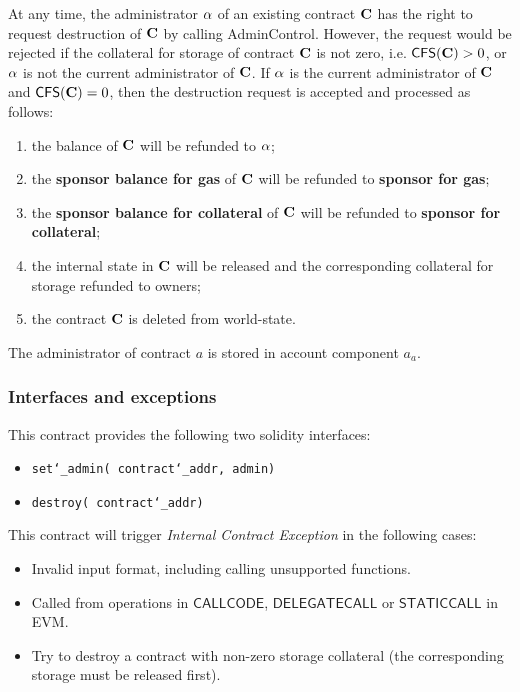 At any time, the administrator $\mathbf{\alpha}$ of an existing contract $\mathbf{C}$ has the right to request destruction of $\mathbf{C}$ by calling AdminControl.
However, the request would be rejected if the collateral for storage of contract $\mathbf{C}$ is not zero, i.e. $\mathsf{CFS}(\mathbf{C})>0$, or $\mathbf{\alpha}$ is not the current administrator of $\mathbf{C}$.
If $\mathbf{\alpha}$ is the current administrator of $\mathbf{C}$ and $\mathsf{CFS}(\mathbf{C})=0$, then the destruction request is accepted and processed as follows:
\begin{enumerate}[nosep]
 	\item the balance of $\mathbf{C}$ will be refunded to $\mathbf{\alpha}$; 

	\item the \textbf{sponsor balance for gas} of $\mathbf{C}$ will be refunded to \textbf{sponsor for gas};

	\item the \textbf{sponsor balance for collateral} of $\mathbf{C}$ will be refunded to \textbf{sponsor for collateral};

	\item the internal state in $\mathbf{C}$ will be released and the corresponding collateral for storage refunded to owners;

	\item the contract $\mathbf{C}$ is deleted from world-state.
\end{enumerate} 

The administrator of contract $a$ is stored in account component $a_a$. 

\subsubsection{Interfaces and exceptions}

This contract provides the following two solidity interfaces:
\begin{itemize}[nosep]
	\item {\tt set\char`_admin( contract\char`_addr,  admin)}
    \item {\tt destroy( contract\char`_addr)}
\end{itemize}

This contract will trigger \emph{Internal Contract Exception} in the following cases:
\begin{itemize}[nosep]
	\item Invalid input format, including calling unsupported functions.

	\item Called from operations in $\mathsf{CALLCODE}$, $\mathsf{DELEGATECALL}$ or $\mathsf{STATICCALL}$ in EVM.
    \item Try to destroy a contract with non-zero storage collateral (the corresponding storage must be released first). 
\end{itemize}

